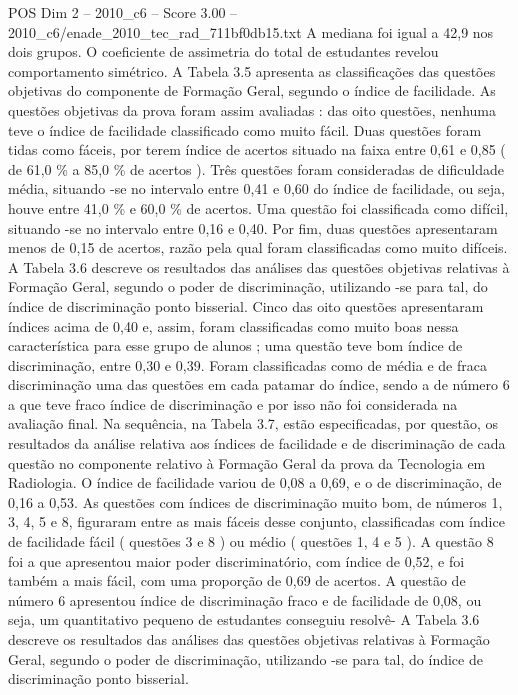 \begin{textsample}{POS Dim 2 – 2010\_c6 – Score 3.00 – 2010\_c6/enade\_2010\_tec\_rad\_711bf0db15.txt}
A mediana foi igual a 42,9 nos dois grupos.
O coeficiente de assimetria do total de estudantes revelou comportamento simétrico.
A Tabela 3.5 apresenta as classificações das questões objetivas do componente de Formação Geral, segundo o índice de facilidade.
As questões objetivas da prova foram assim avaliadas : das oito questões, nenhuma teve o índice de facilidade classificado como muito fácil.
Duas questões foram tidas como fáceis, por terem índice de acertos situado na faixa entre 0,61 e 0,85 ( de 61,0 \% a 85,0 \% de acertos ).
Três questões foram consideradas de dificuldade média, situando -se no intervalo entre 0,41 e 0,60 do índice de facilidade, ou seja, houve entre 41,0 \% e 60,0 \% de acertos.
Uma questão foi classificada como difícil, situando -se no intervalo entre 0,16 e 0,40.
Por fim, duas questões apresentaram menos de 0,15 de acertos, razão pela qual foram classificadas como muito difíceis.
A Tabela 3.6 descreve os resultados das análises das questões objetivas relativas à Formação Geral, segundo o poder de discriminação, utilizando -se para tal, do índice de discriminação ponto bisserial.
Cinco das oito questões apresentaram índices acima de 0,40 e, assim, foram classificadas como muito boas nessa característica para esse grupo de alunos ; uma questão teve bom índice de discriminação, entre 0,30 e 0,39.
Foram classificadas como de média e de fraca discriminação uma das questões em cada patamar do índice, sendo a de número 6 a que teve fraco índice de discriminação e por isso não foi considerada na avaliação final.
Na sequência, na Tabela 3.7, estão especificadas, por questão, os resultados da análise relativa aos índices de facilidade e de discriminação de cada questão no componente relativo à Formação Geral da prova da Tecnologia em Radiologia.
O índice de facilidade variou de 0,08 a 0,69, e o de discriminação, de 0,16 a 0,53.
As questões com índices de discriminação muito bom, de números 1, 3, 4, 5 e 8, figuraram entre as mais fáceis desse conjunto, classificadas com índice de facilidade fácil ( questões 3 e 8 ) ou médio ( questões 1, 4 e 5 ).
A questão 8 foi a que apresentou maior poder discriminatório, com índice de 0,52, e foi também a mais fácil, com uma proporção de 0,69 de acertos.
A questão de número 6 apresentou índice de discriminação fraco e de facilidade de 0,08, ou seja, um quantitativo pequeno de estudantes conseguiu resolvê- A Tabela 3.6 descreve os resultados das análises das questões objetivas relativas à Formação Geral, segundo o poder de discriminação, utilizando -se para tal, do índice de discriminação ponto bisserial.

\end{textsample}
